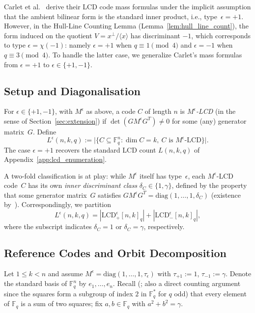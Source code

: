 \documentclass[11pt]{article}
\newcommand{\FF}{\mathbb{F}}
\newcommand{\0}{\mathbf{0}}
\newcommand{\1}{\mathbf{1}}
\theoremstyle{plain}
\theoremstyle{definition}
\theoremstyle{remark}
\begin{document}
Carlet et al.~\cite{carlet2019new} derive their LCD code mass formulas under the implicit assumption that the ambient bilinear form is the standard inner product, i.e., type~$\epsilon = +1$. However, in the Hull-Line Counting Lemma (Lemma~\ref{lem:hull_line_count}), the form induced on the quotient $V = x^\perp / \langle x \rangle$ has discriminant $-1$, which corresponds to type $\epsilon = \chi(-1)$: namely $\epsilon = +1$ when $q \equiv 1 \pmod 4$ and $\epsilon = -1$ when $q \equiv 3 \pmod 4$. To handle the latter case, we generalize Carlet's mass formulas from $\epsilon = +1$ to $\epsilon \in \{+1, -1\}$.

\subsection{Setup and Diagonalisation}

For $\epsilon \in \{+1, -1\}$, with $M^\epsilon$ as above, a code $C$ of length $n$ is \emph{$M^\epsilon$-LCD} (in the sense of Section~\ref{sec:extension}) if $\det(G M^\epsilon G^T) \neq 0$ for some (any) generator matrix~$G$. Define
\[
L^\epsilon(n, k, q) := \bigl|\{C \subseteq \FF_q^n : \dim C = k,\ C \text{ is } M^\epsilon\text{-LCD}\}\bigr|.
\]
The case $\epsilon = +1$ recovers the standard LCD count $L(n, k, q)$ of Appendix~\ref{app:lcd_enumeration}.

A two-fold classification is at play: while $M^\epsilon$ itself has type~$\epsilon$, each $M^\epsilon$-LCD code~$C$ has its own \emph{inner discriminant class} $\delta_C \in \{1, \gamma\}$, defined by the property that some generator matrix~$G$ satisfies $G M^\epsilon G^T = \mathrm{diag}(1, \ldots, 1, \delta_C)$ (existence by~\cite[Theorem~25]{carlet2019new}). Correspondingly, we partition
\[
L^\epsilon(n, k, q) = |\mathrm{LCD}^\epsilon_+[n, k]_q| + |\mathrm{LCD}^\epsilon_-[n, k]_q|,
\]
where the subscript indicates $\delta_C = 1$ or $\delta_C = \gamma$, respectively.

\subsection{Reference Codes and Orbit Decomposition}

Let $1 \leq k < n$ and assume $M^\epsilon = \mathrm{diag}(1, \ldots, 1, \tau_\epsilon)$ with $\tau_{+1} := 1$, $\tau_{-1} := \gamma$. Denote the standard basis of $\FF_q^n$ by $e_1, \ldots, e_n$. Recall (\cite[Lemma~26]{carlet2019new}; also a direct counting argument since the squares form a subgroup of index $2$ in $\FF_q^*$ for $q$ odd) that every element of $\FF_q$ is a sum of two squares; fix $a, b \in \FF_q$ with $a^2 + b^2 = \gamma$.
\end{document}
